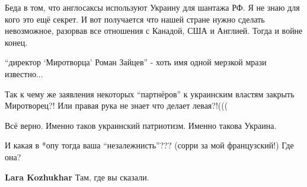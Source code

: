 \begin{itemize}

Беда в том, что англосаксы используют Украину для шантажа РФ. Я не знаю для
кого это ещё секрет. И вот получается что нашей стране нужно сделать
невозможное, разорвав все отношения с Канадой, США и Англией. Тогда и войне
конец.

\enquote{директор \enquote{Миротворца} Роман Зайцев} - хоть имя одной мерзкой мрази известно...


Так к чему же заявления некоторых \enquote{партнёров} к украинским властям
закрыть Миротворец?! Или правая рука не знает что делает левая?!(((

Всё верно. Именно таков украинский патриотизм. Именно такова Украина.

И какая в *опу тогда ваша \enquote{незалежнисть}??? (сорри за мой французский!) Где она?

\textbf{Lara Kozhukhar} Там, где вы сказали.

\end{itemize} %
